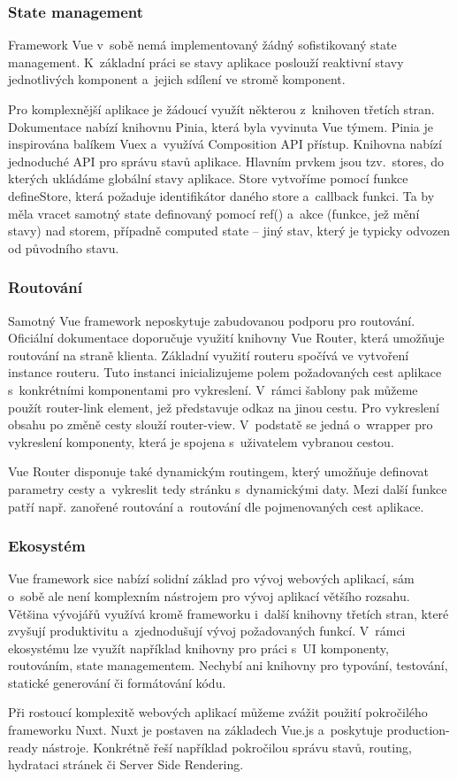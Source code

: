 \subsubsection{State management}

Framework Vue v~sobě nemá implementovaný žádný sofistikovaný state management. 
K~základní práci se stavy aplikace poslouží reaktivní stavy jednotlivých komponent a~jejich sdílení ve stromě komponent.

Pro komplexnější aplikace je žádoucí využít některou z~knihoven třetích stran. Dokumentace nabízí knihovnu Pinia, která byla vyvinuta Vue týmem. 
Pinia je inspirována balíkem Vuex a~využívá Composition API přístup. Knihovna nabízí jednoduché API pro správu stavů aplikace. 
Hlavním prvkem jsou tzv.~stores, do kterých ukládáme globální stavy aplikace. 
Store vytvoříme pomocí funkce defineStore, která požaduje identifikátor daného store a~callback funkci. 
Ta by měla vracet samotný state definovaný pomocí ref() a~akce (funkce, jež mění stavy) nad storem, případně computed state -- jiný stav, který je typicky odvozen od původního stavu.\cite{pinia,vue}

\subsubsection{Routování}

Samotný Vue framework neposkytuje zabudovanou podporu pro routování. Oficiální dokumentace doporučuje využití knihovny Vue Router, která umožňuje routování na straně klienta. 
Základní využití routeru spočívá ve vytvoření instance routeru. Tuto instanci inicializujeme polem požadovaných cest aplikace s~konkrétními komponentami pro vykreslení. 
V~rámci šablony pak můžeme použít router-link element, jež představuje odkaz na jinou cestu. Pro vykreslení obsahu po změně cesty slouží router-view. 
V~podstatě se jedná o~wrapper pro vykreslení komponenty, která je spojena s~uživatelem vybranou cestou.

Vue Router disponuje také dynamickým routingem, který umožňuje definovat parametry cesty a~vykreslit tedy stránku s~dynamickými daty. 
Mezi další funkce patří např. zanořené routování a~routování dle pojmenovaných cest aplikace.\cite{vue,vuerouter}

\subsubsection{Ekosystém}

Vue framework sice nabízí solidní základ pro vývoj webových aplikací, sám o~sobě ale není komplexním nástrojem pro vývoj aplikací většího rozsahu. 
Většina vývojářů využívá kromě frameworku i~další knihovny třetích stran, které zvyšují produktivitu a~zjednodušují vývoj požadovaných funkcí. 
V~rámci ekosystému lze využít například knihovny pro práci s~UI komponenty, routováním, state managementem. 
Nechybí ani knihovny pro typování, testování, statické generování či formátování kódu.

Při rostoucí komplexitě webových aplikací můžeme zvážit použití pokročilého frameworku Nuxt. Nuxt je postaven na základech Vue.js a~poskytuje production-ready nástroje. 
Konkrétně řeší například pokročilou správu stavů, routing, hydrataci stránek či Server Side Rendering.\cite{awesomevue,vue}